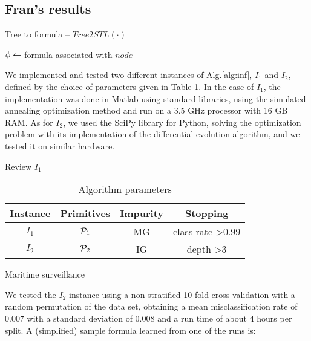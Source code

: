 \subsection{Fran's results}
\begin{algorithm}
\caption{Tree to formula -- $Tree2STL(\cdot)$}
\label{alg:tree2formula}
\DontPrintSemicolon
{}
\BlankLine


$\phi \leftarrow$ formula associated with $node$

\end{algorithm}

We implemented and tested two different instances of Alg.\ref{alg:inf}, $I_1$ and $I_2$, defined by the choice of parameters given in Table \ref{tab:inst}. In the case of $I_1$, the implementation was done in Matlab using standard libraries, using the simulated annealing optimization method and run on a 3.5 GHz processor with 16 GB RAM. As for $I_2$, we used the SciPy library for Python, solving the optimization problem with its implementation of the differential evolution algorithm, and we tested it on similar hardware.

{\color{blue} Review $I_1$}

\begin{table}
\begin{tabular}{|c|c|c|c|}
    \hline
    Instance & Primitives & Impurity & Stopping \\ \hline
    $I_1$ & $\mathcal{P}_1$ & MG & class rate >0.99 \\ \hline
    $I_2$ & $\mathcal{P}_2$ & IG & depth >3 \\ \hline
\end{tabular}
\caption{Algorithm parameters}
\label{tab:inst}
\end{table}

Maritime surveillance

We tested the $I_2$ instance using a non stratified 10-fold cross-validation with a random permutation of the data set, obtaining a mean misclassification rate of 0.007 with a standard deviation of 0.008 and a run time of about 4 hours per split. A (simplified) sample formula learned from one of the runs is:

